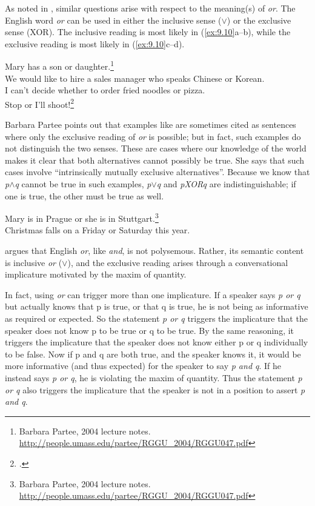 As noted in , similar questions arise with respect to the meaning(s) of \textit{or}. The English word \textit{or} can be used in either the inclusive sense ($\vee$) or the exclusive sense (XOR). The inclusive reading is most likely in (\ref{ex:9.10}a--b), while the exclusive reading is most likely in (\ref{ex:9.10}c--d).


\ea \label{ex:9.10}
\ea Mary has a son or daughter.\footnote{Barbara Partee, 2004 lecture notes. \url{http://people.umass.edu/partee/RGGU_2004/RGGU047.pdf}} \\
\ex We would like to hire a sales manager who speaks Chinese or Korean.\\
\ex I can’t decide whether to order fried noodles or pizza.\\
\ex Stop or I’ll shoot!\footnote{\citet[113]{Saeed2009}.}
                       \z
\z


Barbara Partee points out that examples like  are sometimes cited as sentences where only the exclusive reading of \textit{or} is possible; but in fact, such examples do not distinguish the two senses. These are cases where our knowledge of the world makes it clear that both alternatives cannot possibly be true. She says that such cases involve “intrinsically mutually exclusive alternatives”. Because we know that \textit{p$\wedge$q} cannot be true in such examples, \textit{p$\vee$q} and \textit{pXORq} are indistinguishable; if one is true, the other must be true as well.


\ea \label{ex:9.11}
\ea Mary is in Prague or she is in Stuttgart.\footnote{Barbara Partee, 2004 lecture notes. \url{http://people.umass.edu/partee/RGGU_2004/RGGU047.pdf}} \\
\ex Christmas falls on a Friday or Saturday this year.
                       \z
\z


\citet{Grice1978} argues that English \textit{or}, like \textit{and}, is not polysemous. Rather, its semantic content is inclusive \textit{or} ($\vee$), and the exclusive reading arises through a conversational implicature motivated by the maxim of quantity.



In fact, using \textit{or} can trigger more than one implicature. If a speaker says \textit{p or q} but actually knows that p is true, or that q is true, he is not being as informative as required or expected. So the statement \textit{p or q} triggers the implicature that the speaker does not know p to be true or q to be true. By the same reasoning, it triggers the implicature that the speaker does not know either p or q individually to be false. Now if p and q are both true, and the speaker knows it, it would be more informative (and thus expected) for the speaker to say \textit{p and q}. If he instead says \textit{p or q}, he is violating the maxim of quantity. Thus the statement \textit{p or q} also triggers the implicature that the speaker is not in a position to assert \textit{p and q}.




